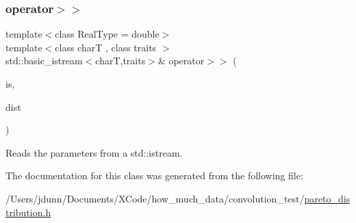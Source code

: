 \subsubsection{\texorpdfstring{operator$>$$>$}{operator>>}}
{\footnotesize\ttfamily template$<$class Real\+Type  = double$>$ \\
template$<$class charT , class traits $>$ \\
std\+::basic\+\_\+istream$<$charT,traits$>$\& operator$>$$>$ (\begin{DoxyParamCaption}\item[{std\+::basic\+\_\+istream$<$ charT, traits $>$ \&}]{is,  }\item[{\mbox{\hyperlink{classpareto__distribution}{pareto\+\_\+distribution}}$<$ Real\+Type $>$ \&}]{dist }\end{DoxyParamCaption})\hspace{0.3cm}{\ttfamily [friend]}}



Reads the parameters from a std\+::istream. 



The documentation for this class was generated from the following file\+:\begin{DoxyCompactItemize}
\item 
/\+Users/jdunn/\+Documents/\+X\+Code/how\+\_\+much\+\_\+data/convolution\+\_\+test/\mbox{\hyperlink{pareto__distribution_8h}{pareto\+\_\+distribution.\+h}}\end{DoxyCompactItemize}
